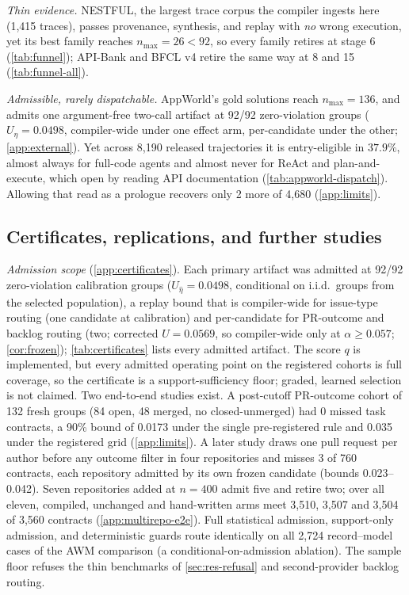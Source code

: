 \emph{Thin evidence.} NESTFUL, the largest trace corpus the compiler ingests here
(1{,}415 traces), passes provenance, synthesis, and replay with \emph{no} wrong
execution, yet its best family reaches $n_{\max}=26<92$, so every family retires
at stage 6 (\cref{tab:funnel}); API-Bank and BFCL v4 retire the same way at 8
and 15 (\cref{tab:funnel-all}).

\emph{Admissible, rarely dispatchable.} AppWorld's gold solutions reach
$n_{\max}=136$, and \method admits one argument-free two-call artifact at 92/92
zero-violation groups ($U_{\hat\eta}=0.0498$, compiler-wide under one effect
arm, per-candidate under the other; \cref{app:external}). Yet across 8{,}190
released trajectories it is entry-eligible in $37.9\%$, almost always for
full-code agents and almost never for ReAct and plan-and-execute, which open by
reading API documentation (\cref{tab:appworld-dispatch}). Allowing that read as
a prologue recovers only 2 more of 4{,}680 (\cref{app:limits}).

\subsection{Certificates, replications, and further studies}
\label{sec:res-more}

\emph{Admission scope} (\cref{app:certificates}). Each primary artifact was
admitted at 92/92 zero-violation calibration groups ($U_{\hat\eta}=0.0498$,
conditional on i.i.d.\ groups from the selected population), a replay bound that is
compiler-wide for issue-type routing (one candidate at calibration) and
per-candidate for PR-outcome and backlog routing (two; corrected $U=0.0569$, so
compiler-wide only at $\alpha\ge0.057$; \cref{cor:frozen}); \cref{tab:certificates}
lists every admitted artifact. The score $q$ is implemented, but every admitted
operating point on the registered cohorts is full coverage, so the certificate
is a support-sufficiency floor; graded, learned selection is not claimed.
Two end-to-end studies exist. A post-cutoff PR-outcome cohort of 132 fresh
groups (84 open, 48 merged, no closed-unmerged) had 0 missed task contracts,
a 90\% bound of 0.0173 under the single pre-registered rule and 0.035 under the
registered grid (\cref{app:limits}). A later study draws one pull request per
author before any outcome filter in four repositories and misses 3 of 760
contracts, each repository admitted by its own frozen candidate (bounds
0.023--0.042). Seven repositories added at $n=400$ admit five and retire two;
over all eleven, compiled, unchanged and hand-written arms meet 3{,}510, 3{,}507
and 3{,}504 of 3{,}560 contracts (\cref{app:multirepo-e2e}). Full statistical admission, support-only
admission, and deterministic guards route identically on all 2{,}724
record--model cases of the AWM comparison (a conditional-on-admission ablation).
The sample floor refuses the thin benchmarks of \cref{sec:res-refusal} and
second-provider backlog routing.

